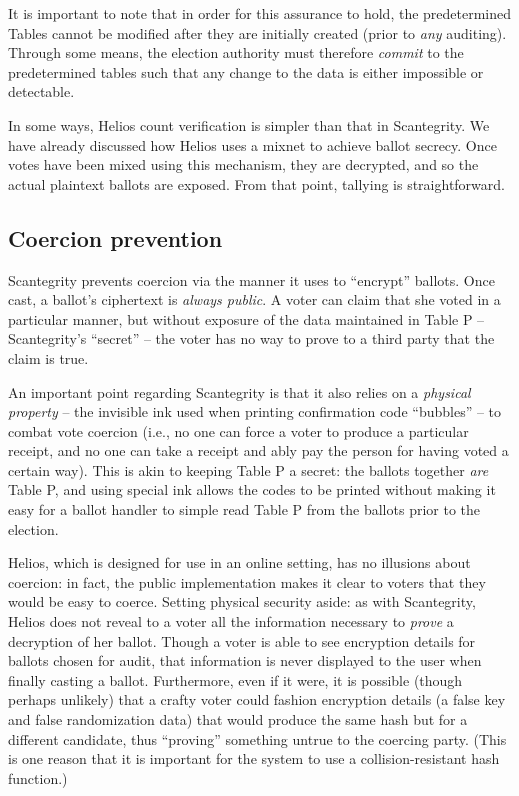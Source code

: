 \documentclass[10pt,twocolumn]{article}
\newcommand{\term}[1]{\textit{#1}}
\begin{document}
It is important to note that in order for this assurance to hold, the predetermined Tables cannot be
modified after they are initially created (prior to \emph{any} auditing). Through some means, the
election authority must therefore \term{commit} to the predetermined tables such that any change to
the data is either impossible or detectable.

In some ways, Helios count verification is simpler than that in Scantegrity. We have already
discussed how Helios uses a mixnet to achieve ballot secrecy. Once votes have been mixed using this
mechanism, they are decrypted, and so the actual plaintext ballots are exposed. From that point,
tallying is straightforward.

\subsection{Coercion prevention}

Scantegrity prevents coercion via the manner it uses to ``encrypt'' ballots. Once cast, a ballot's
ciphertext is \emph{always public}. A voter can claim that she voted in a particular manner, but
without exposure of the data maintained in Table P -- Scantegrity's ``secret'' -- the voter has no
way to prove to a third party that the claim is true.

An important point regarding Scantegrity is that it also relies on a \emph{physical property} -- the
invisible ink used when printing confirmation code ``bubbles'' -- to combat vote coercion (i.e., no
one can force a voter to produce a particular receipt, and no one can take a receipt and ably pay
the person for having voted a certain way). This is akin to keeping Table P a secret: the ballots
together \emph{are} Table P, and using special ink allows the codes to be printed without making it
easy for a ballot handler to simple read Table P from the ballots prior to the election.

Helios, which is designed for use in an online setting, has no illusions about coercion: in fact,
the public implementation makes it clear to voters that they would be easy to coerce. Setting
physical security aside: as with Scantegrity, Helios does not reveal to a voter all the
information necessary to \emph{prove} a decryption of her ballot. Though a voter is able to see
encryption details for ballots chosen for audit, that information is never displayed to the user
when finally casting a ballot. Furthermore, even if it were, it is possible (though perhaps
unlikely) that a crafty voter could fashion encryption details (a false key and false randomization
data) that would produce the same hash but for a different candidate, thus ``proving'' something
untrue to the coercing party. (This is one reason that it is important for the system to use a
collision-resistant hash function.)
\end{document}
